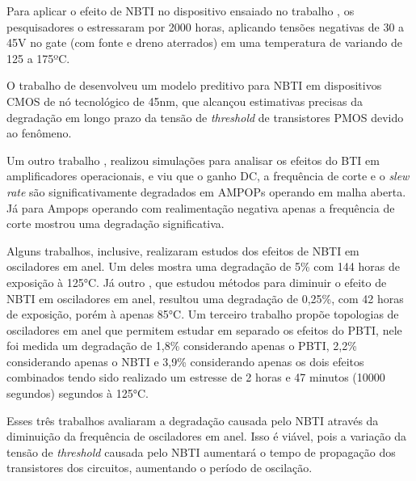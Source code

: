Para aplicar o efeito de NBTI no dispositivo ensaiado no trabalho \cite{Davidovic}, os pesquisadores o estressaram por 2000 horas, aplicando tensões negativas de 30 a 45V no gate (com fonte e dreno aterrados) em uma temperatura de variando de 125 a 175ºC.

O trabalho de \cite{Bhardwaj} desenvolveu um modelo preditivo para NBTI em dispositivos CMOS de nó tecnológico de 45nm, que alcançou estimativas precisas da degradação em longo prazo da tensão de \textit{threshold} de transistores PMOS devido ao fenômeno.

Um outro trabalho \cite{Grossi}, realizou simulações para analisar os efeitos do BTI em amplificadores operacionais, e viu que o ganho DC, a frequência de corte e o \textit{slew rate} são significativamente degradados em AMPOPs operando em malha aberta. Já para Ampops operando com realimentação negativa apenas a frequência de corte mostrou uma degradação significativa.

Alguns trabalhos, inclusive, realizaram estudos dos efeitos de NBTI em osciladores em anel. Um deles \cite{Lorenz} mostra uma degradação de 5\% com 144 horas de exposição à 125°C. Já outro \cite{Sato}, que estudou métodos para diminuir o efeito de NBTI em osciladores em anel, resultou uma degradação de 0,25\%, com 42 horas de exposição, porém à apenas 85°C. Um terceiro trabalho \cite{Linder} propõe topologias de osciladores em anel que permitem estudar em separado os efeitos do PBTI, nele foi medida um degradação de 1,8\% considerando apenas o PBTI, 2,2\% considerando apenas o NBTI e 3,9\%  considerando apenas os dois efeitos combinados tendo sido realizado um estresse de 2 horas e 47 minutos (10000 segundos) segundos à 125°C.

Esses três trabalhos avaliaram a degradação causada pelo NBTI através da diminuição da frequência de osciladores em anel. Isso é viável, pois a variação da tensão de \textit{threshold} causada pelo NBTI aumentará o tempo de propagação dos transistores dos circuitos, aumentando o período de oscilação. 